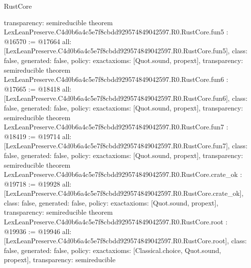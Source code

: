 \begin{lexlean}{RustCore}
\begin{coremodule}
{  transparency: semireducible
}
theorem LexLeanPreserve.C4d0b6a4c5e7f8cbdd929574849042597.R0.RustCore.fun5 : @16570 := @17664 {
  all: [LexLeanPreserve.C4d0b6a4c5e7f8cbdd929574849042597.R0.RustCore.fun5],
  class: false,
  generated: false,
  policy: exact{axioms: [Quot.sound, propext]},
  transparency: semireducible
}
theorem LexLeanPreserve.C4d0b6a4c5e7f8cbdd929574849042597.R0.RustCore.fun6 : @17665 := @18418 {
  all: [LexLeanPreserve.C4d0b6a4c5e7f8cbdd929574849042597.R0.RustCore.fun6],
  class: false,
  generated: false,
  policy: exact{axioms: [Quot.sound, propext]},
  transparency: semireducible
}
theorem LexLeanPreserve.C4d0b6a4c5e7f8cbdd929574849042597.R0.RustCore.fun7 : @18419 := @19714 {
  all: [LexLeanPreserve.C4d0b6a4c5e7f8cbdd929574849042597.R0.RustCore.fun7],
  class: false,
  generated: false,
  policy: exact{axioms: [Quot.sound, propext]},
  transparency: semireducible
}
theorem LexLeanPreserve.C4d0b6a4c5e7f8cbdd929574849042597.R0.RustCore.crate_ok : @19718 := @19928 {
  all: [LexLeanPreserve.C4d0b6a4c5e7f8cbdd929574849042597.R0.RustCore.crate_ok],
  class: false,
  generated: false,
  policy: exact{axioms: [Quot.sound, propext]},
  transparency: semireducible
}
theorem LexLeanPreserve.C4d0b6a4c5e7f8cbdd929574849042597.R0.RustCore.root : @19936 := @19946 {
  all: [LexLeanPreserve.C4d0b6a4c5e7f8cbdd929574849042597.R0.RustCore.root],
  class: false,
  generated: false,
  policy: exact{axioms: [Classical.choice, Quot.sound, propext]},
  transparency: semireducible
}


\end{coremodule}
\end{lexlean}
